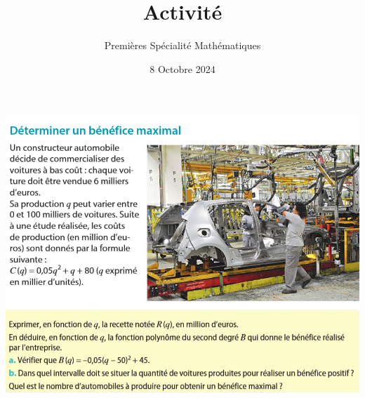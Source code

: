 \documentclass{article}
\title{Activité}
\date{8 Octobre 2024}
\author{Premières Spécialité Mathématiques}
\begin{document}
\begin{center}
\includegraphics[width=\textwidth]{Activite.png}
\end{center}
\end{document}
